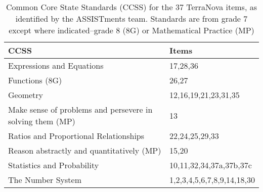 \begin{table*}[ht]
\centering
\begin{tabular}{p{3in}p{3in}}
  \hline
CCSS & Items \\ 
  \hline
Expressions and Equations & 17,28,36 \\ 
  Functions (8G) & 26,27 \\ 
  Geometry & 12,16,19,21,23,31,35 \\ 
  Make sense of problems and persevere in solving them (MP) & 13 \\ 
  Ratios and Proportional Relationships & 22,24,25,29,33 \\ 
  Reason abstractly and quantitatively (MP) & 15,20 \\ 
  Statistics and Probability & 10,11,32,34,37a,37b,37c \\ 
  The Number System & 1,2,3,4,5,6,7,8,9,14,18,30 \\ 
   \hline
\end{tabular}
\caption{Common Core State Standards (CCSS) for the 37 TerraNova items, as identified by the ASSISTments team. Standards are from grade 7 except where indicated--grade 8 (8G) or Mathematical Practice (MP)} 
\label{tab:assistmentsSkills}
\end{table*}
